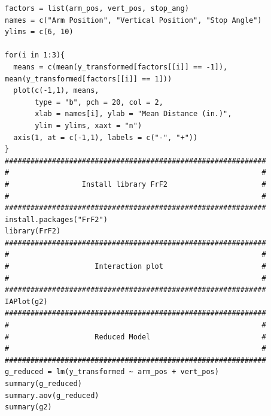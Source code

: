 \documentclass[11pt]{article}
\begin{document}
\begin{verbatim}
factors = list(arm_pos, vert_pos, stop_ang)
names = c("Arm Position", "Vertical Position", "Stop Angle")
ylims = c(6, 10)

for(i in 1:3){
  means = c(mean(y_transformed[factors[[i]] == -1]), mean(y_transformed[factors[[i]] == 1]))
  plot(c(-1,1), means,
       type = "b", pch = 20, col = 2,
       xlab = names[i], ylab = "Mean Distance (in.)",
       ylim = ylims, xaxt = "n")
  axis(1, at = c(-1,1), labels = c("-", "+"))
}
#############################################################
#                                                           #
#                 Install library FrF2                      #
#                                                           #
#############################################################
install.packages("FrF2")
library(FrF2)
#############################################################
#                                                           #
#                    Interaction plot                       #
#                                                           #
#############################################################
IAPlot(g2)
#############################################################
#                                                           #
#                    Reduced Model                          #
#                                                           #
#############################################################
g_reduced = lm(y_transformed ~ arm_pos + vert_pos)
summary(g_reduced)
summary.aov(g_reduced)
summary(g2)


	\end{verbatim}	
	
	
	
	
\end{document}
